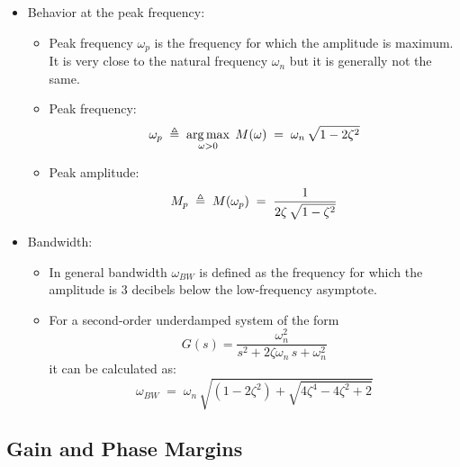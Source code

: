 \documentclass[ 10pt, xcolor = dvipsnames]{beamer}
\begin{document}
\begin{frame}[allowframebreaks]
\begin{itemize}
\item Behavior at the peak frequency:
\begin{itemize}
\item Peak frequency $\omega_p$ is the frequency for which the amplitude is maximum. \linebreak It is very close to the natural frequency $\omega_n$ but it is generally not the same. 
\item Peak frequency: 
\[
\omega_p \; \triangleq \; 
\operatorname*{arg\,max}_{ \omega > 0 } \; M(\omega) \; = \;
\omega_n \, \sqrt{1 - 2 \zeta^2}
\]
\item Peak amplitude: 
\[
M_p \; \triangleq \; M(\omega_p) \; = \;
\frac{1}{ 2 \zeta \, \sqrt{1 - \zeta^2}}
\]
\end{itemize}
\framebreak

\item Bandwidth: 
\begin{itemize}
\item In general bandwidth $\omega_{BW}$ is defined as the frequency for which the amplitude is 3 decibels below the low-frequency asymptote. 
\item For a second-order underdamped system of the form
\[
G(s) = \frac{\omega_n^2}{s^2 + 2 \zeta \omega_n \, s + \omega_n^2}
\]
it can be calculated as: 
\[
\omega_{BW} \; = \; \omega_n \, 
\sqrt{ (1 - 2 \zeta^2) + \sqrt{4 \zeta^4 - 4 \zeta^2 + 2} }
\]
\end{itemize}

\end{itemize}

\end{frame}

\subsection{Gain and Phase Margins}
\end{document}
